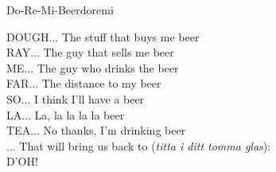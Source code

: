 \begin{song}{Do-Re-Mi-Beer}{doremi}
\begin{vers}
DOUGH... The stuff that buys me beer\\
RAY... The guy that sells me beer\\
ME... The guy who drinks the beer\\
FAR... The distance to my beer\\
SO... I think I'll have a beer\\
LA... La, la la la la beer\\
TEA... No thanks, I'm drinking beer\\
... That will bring us back to (\textit{titta i ditt tomma glas}):\\
D'OH! \\
\end{vers}
\end{song}
